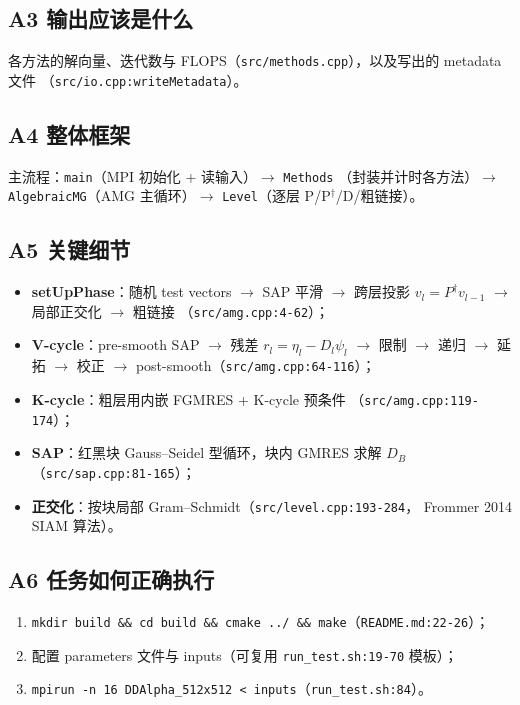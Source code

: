 \documentclass[UTF8]{ctexart}
\begin{document}
\subsection{A3 输出应该是什么}
各方法的解向量、迭代数与 FLOPS（\texttt{src/methods.cpp}），以及写出的 metadata 文件
（\texttt{src/io.cpp:writeMetadata}）。

\subsection{A4 整体框架}
主流程：\texttt{main}（MPI 初始化 + 读输入）$\rightarrow$ \texttt{Methods}
（封装并计时各方法）$\rightarrow$ \texttt{AlgebraicMG}（AMG 主循环）$\rightarrow$
\texttt{Level}（逐层 P/P$^\dagger$/D/粗链接）。

\subsection{A5 关键细节}
\begin{itemize}
  \item \textbf{setUpPhase}：随机 test vectors $\rightarrow$ SAP 平滑 $\rightarrow$
        跨层投影 $v_l=P^\dagger v_{l-1}$ $\rightarrow$ 局部正交化 $\rightarrow$ 粗链接
        （\texttt{src/amg.cpp:4-62}）；
  \item \textbf{V-cycle}：pre-smooth SAP $\rightarrow$ 残差 $r_l=\eta_l-D_l\psi_l$
        $\rightarrow$ 限制 $\rightarrow$ 递归 $\rightarrow$ 延拓 $\rightarrow$ 校正
        $\rightarrow$ post-smooth（\texttt{src/amg.cpp:64-116}）；
  \item \textbf{K-cycle}：粗层用内嵌 FGMRES + K-cycle 预条件
        （\texttt{src/amg.cpp:119-174}）；
  \item \textbf{SAP}：红黑块 Gauss--Seidel 型循环，块内 GMRES 求解 $D_B$
        （\texttt{src/sap.cpp:81-165}）；
  \item \textbf{正交化}：按块局部 Gram--Schmidt（\texttt{src/level.cpp:193-284}，
        Frommer 2014 SIAM 算法）。
\end{itemize}

\subsection{A6 任务如何正确执行}
\begin{enumerate}
  \item \texttt{mkdir build \&\& cd build \&\& cmake ../ \&\& make}（\texttt{README.md:22-26}）；
  \item 配置 parameters 文件与 inputs（可复用 \texttt{run\_test.sh:19-70} 模板）；
  \item \texttt{mpirun -n 16 DDAlpha\_512x512 < inputs}（\texttt{run\_test.sh:84}）。
\end{enumerate}
\end{document}

